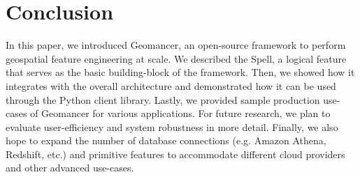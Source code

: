 \documentclass{article}
\begin{document}
\section{Conclusion}

In this paper, we introduced Geomancer, an open-source framework to perform
geospatial feature engineering at scale. We described the Spell, a logical
feature that serves as the basic building-block of the framework. Then, we
showed how it integrates with the overall architecture and demonstrated how it
can be used through the Python client library. Lastly, we provided sample
production use-cases of Geomancer for various applications. For future
research, we plan to evaluate user-efficiency and system robustness in more
detail. Finally, we also hope to expand the number of database connections
(e.g. Amazon Athena, Redshift, etc.) and primitive features to accommodate
different cloud providers and other advanced use-cases.
 


\end{document}
